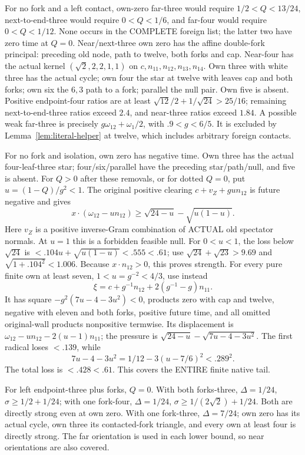\documentclass[11pt]{article}
\begin{document}
For no fork and a left contact, own-zero far-three
would require \(1/2<Q<13/24\), next-to-end-three
would require \(0<Q<1/6\), and far-four would
require \(0<Q<1/12\).
None occurs in the COMPLETE foreign list; the latter
two have zero time at \(Q=0\).
Near/next-three own zero has the affine double-fork
principal: preceding old node, path to twelve,
both forks and cap.
Near-four has the actual kernel
\((\sqrt2,2,2,1,1)\) on
\(c,n_{11},n_{12},n_{13},n_{14}\).
Own three with white three has the actual cycle;
own four the star at twelve with leaves cap and
both forks; own six the \(6,3\) path to a fork;
parallel the null pair.
Own five is absent.
Positive endpoint-four ratios are at least
\(\sqrt{12}/2+1/\sqrt{24}>25/16\);
remaining next-to-end-three ratios exceed \(2.4\),
and near-three ratios exceed \(1.84\).
A possible weak far-three is precisely
\(g\omega_{12}+\omega_1/2\), with
\(.9<g<6/5\).
It is excluded by Lemma~\ref{lem:literal-helper}
at twelve, which includes arbitrary foreign contacts.

For no fork and isolation, own zero has negative time.
Own three has the actual four-leaf-three star;
four/six/parallel have the preceding star/path/null,
and five is absent.
For \(Q>0\) after these removals, or for dotted
\(Q=0\), put \(u=(1-Q)/g^2<1\).
The original positive clearing
\(c+v_Z+gu n_{12}\) is future negative and gives
\[
 x\cdot(\omega_{12}-un_{12})
                \ge\sqrt{24-u}-\sqrt{u(1-u)} .
\]
Here \(v_Z\) is a positive inverse-Gram combination
of ACTUAL old spectator normals.
At \(u=1\) this is a forbidden feasible null.
For \(0<u<1\), the loss below \(\sqrt{24}\) is
\(<.104u+\sqrt{u(1-u)}<.555<.61\);
use \(\sqrt{24}+\sqrt{23}>9.69\) and
\(\sqrt{1+.104^2}<1.006\).
Because \(x\cdot n_{12}>0\), this proves strength.
For every pure finite own at least seven,
\(1<u=g^{-2}<4/3\), use instead
\[
              \xi=c+g^{-1}n_{12}+2(g^{-1}-g)n_{11}.
\]
It has square \(-g^2(7u-4-3u^2)<0\), products zero
with cap and twelve, negative with eleven and both
forks, positive future time, and all omitted
original-wall products nonpositive termwise.
Its displacement is
\(\omega_{12}-un_{12}-2(u-1)n_{11}\);
the pressure is
\(\sqrt{24-u}-\sqrt{7u-4-3u^2}\).
The first radical loses \(<.139\), while
\[
              7u-4-3u^2=1/12-3(u-7/6)^2<.289^2 .
\]
The total loss is \(<.428<.61\).
This covers the ENTIRE finite native tail.

For left endpoint-three plus forks, \(Q=0\).
With both forks-three,
\(\Delta=1/24\), \(\sigma\ge1/2+1/24\);
with one fork-four,
\(\Delta=1/24\), \(\sigma\ge1/(2\sqrt2)+1/24\).
Both are directly strong even at own zero.
With one fork-three,
\(\Delta=7/24\); own zero has its actual cycle,
own three its contacted-fork triangle,
and every own at least four is directly strong.
The far orientation is used in each lower bound,
so near orientations are also covered.
\end{document}
